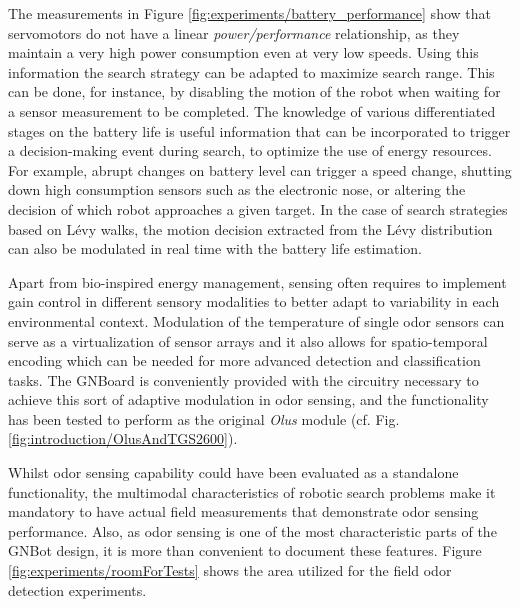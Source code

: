 The measurements in Figure \ref{fig:experiments/battery_performance} show that servomotors do not have a linear \emph{power/performance} relationship, as they maintain a very high power consumption even at very low speeds. Using this information the search strategy can be adapted to maximize search range. This can be done, for instance, by disabling the motion of the robot when waiting for a sensor measurement to be completed.
The knowledge of various differentiated stages on the battery life is useful information that can be incorporated to trigger a decision-making event during search, to optimize the use of energy resources.
For example, abrupt changes on battery level can trigger a speed change, shutting down high consumption sensors such as the electronic nose, or altering the decision of which robot approaches a given target.
In the case of search strategies based on L\'evy walks, the motion decision extracted from the L\'evy distribution can also be modulated in real time with the battery life estimation.



Apart from bio-inspired energy management, sensing often requires to implement gain control in different sensory modalities to better adapt to variability in each environmental context. Modulation of the temperature of single odor sensors can serve as a virtualization of sensor arrays and it also allows for spatio-temporal encoding which can be needed for more advanced detection and classification tasks. The GNBoard is conveniently provided with the circuitry necessary to achieve this sort of adaptive modulation in odor sensing, and the functionality has been tested to perform as the original \emph{Olus} module (cf. Fig. \ref{fig:introduction/OlusAndTGS2600}).

Whilst odor sensing capability could have been evaluated as a standalone functionality, the multimodal characteristics of robotic search problems make it mandatory to have actual field measurements that demonstrate odor sensing performance. Also, as odor sensing is one of the most characteristic parts of the GNBot design, it is more than convenient to document these features.
Figure \ref{fig:experiments/roomForTests} shows the area utilized for the field odor detection experiments.

